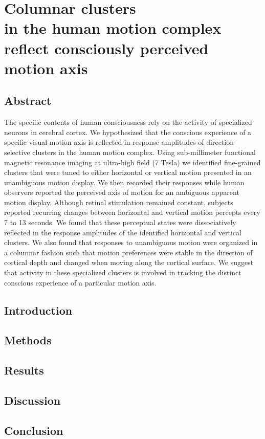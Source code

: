 \chapter[Columnar clusters in the human motion complex reflect consciously perceived motion axis]{Columnar clusters\\ in the human motion complex\\ reflect consciously perceived\\ motion axis}

\clearpage{\thispagestyle{empty}\cleardoublepage}

\section{Abstract}
The specific contents of human consciousness rely on the activity of specialized neurons in cerebral cortex. We hypothesized that the conscious experience of a specific visual motion axis is reflected in response amplitudes of direction-selective clusters in the human motion complex. Using sub-millimeter functional magnetic resonance imaging at ultra-high field (7 Tesla) we identified fine-grained clusters that were tuned to either horizontal or vertical motion presented in an unambiguous motion display. We then recorded their responses while human observers reported the perceived axis of motion for an ambiguous apparent motion display. Although retinal stimulation remained constant, subjects reported recurring changes between horizontal and vertical motion percepts every 7 to 13 seconds. We found that these perceptual states were dissociatively reflected in the response amplitudes of the identified horizontal and vertical clusters. We also found that responses to unambiguous motion were organized in a columnar fashion such that motion preferences were stable in the direction of cortical depth and changed when moving along the cortical surface. We suggest that activity in these specialized clusters is involved in tracking the distinct conscious experience of a particular motion axis.


\section{Introduction}
\lipsum[1-1]

\section{Methods}
\lipsum[1-2]

\section{Results}
\lipsum[1-3] 
\cite{Lakatos1970}

\section{Discussion}
\lipsum[1-4]

\section{Conclusion}
\lipsum[1-5]

\clearpage
\printbibliography[heading=subbibnumbered, title={References}]